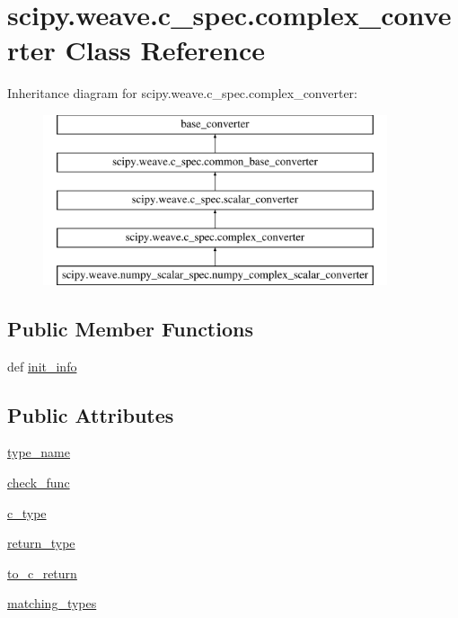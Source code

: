 \hypertarget{classscipy_1_1weave_1_1c__spec_1_1complex__converter}{}\section{scipy.\+weave.\+c\+\_\+spec.\+complex\+\_\+converter Class Reference}
\label{classscipy_1_1weave_1_1c__spec_1_1complex__converter}
Inheritance diagram for scipy.\+weave.\+c\+\_\+spec.\+complex\+\_\+converter\+:\begin{figure}[H]
\begin{center}
\leavevmode
\includegraphics[height=5.000000cm]{classscipy_1_1weave_1_1c__spec_1_1complex__converter}
\end{center}
\end{figure}
\subsection*{Public Member Functions}
\begin{DoxyCompactItemize}
\item 
def \hyperlink{classscipy_1_1weave_1_1c__spec_1_1complex__converter_a9fe87dd90355658e00f7840131a56ef1}{init\+\_\+info}
\end{DoxyCompactItemize}
\subsection*{Public Attributes}
\begin{DoxyCompactItemize}
\item 
\hyperlink{classscipy_1_1weave_1_1c__spec_1_1complex__converter_ae489c2f7cc630d5e1e2486bac6605163}{type\+\_\+name}
\item 
\hyperlink{classscipy_1_1weave_1_1c__spec_1_1complex__converter_a5bc1f51fc2017b8b198375aeb25abf47}{check\+\_\+func}
\item 
\hyperlink{classscipy_1_1weave_1_1c__spec_1_1complex__converter_a2ec537dd8ede38258111f3df1157145e}{c\+\_\+type}
\item 
\hyperlink{classscipy_1_1weave_1_1c__spec_1_1complex__converter_a7e80d14f902ba37e7bbcab7444ac3e66}{return\+\_\+type}
\item 
\hyperlink{classscipy_1_1weave_1_1c__spec_1_1complex__converter_a8067eb70b377073215da106615916fdf}{to\+\_\+c\+\_\+return}
\item 
\hyperlink{classscipy_1_1weave_1_1c__spec_1_1complex__converter_a3ed0499a5f1d7b7723672113f38b5ef0}{matching\+\_\+types}
\end{DoxyCompactItemize}


